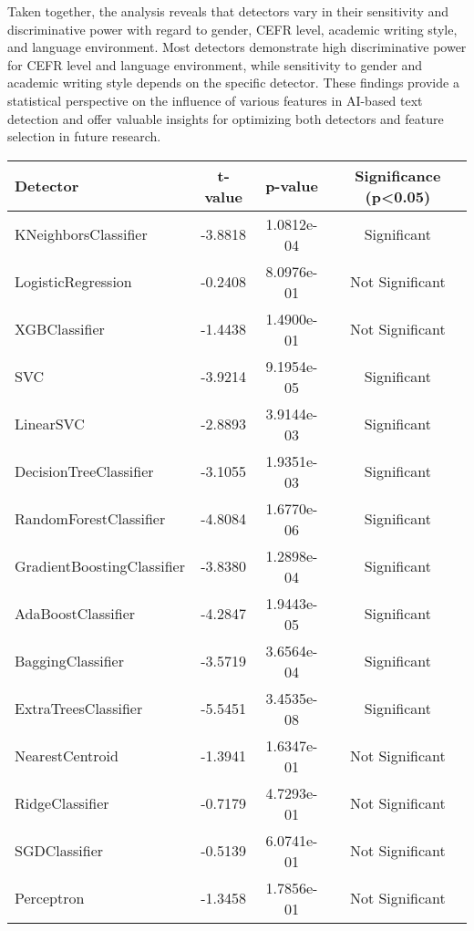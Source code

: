 Taken together, the analysis reveals that detectors vary in their sensitivity and discriminative power with regard to gender, CEFR level, academic writing style, and language environment. Most detectors demonstrate high discriminative power for CEFR level and language environment, while sensitivity to gender and academic writing style depends on the specific detector. These findings provide a statistical perspective on the influence of various features in AI-based text detection and offer valuable insights for optimizing both detectors and feature selection in future research.


\begin{table*}[htbp]
\centering
\small
\begin{tabular}{lccc}
\toprule
\textbf{Detector} & \textbf{t-value} & \textbf{p-value} & \textbf{Significance (p<0.05)} \\
\midrule
KNeighborsClassifier            & -3.8818 & 1.0812e-04 & Significant \\
LogisticRegression              & -0.2408 & 8.0976e-01 & Not Significant \\
XGBClassifier                   & -1.4438 & 1.4900e-01 & Not Significant \\
SVC                             & -3.9214 & 9.1954e-05 & Significant \\
LinearSVC                       & -2.8893 & 3.9144e-03 & Significant \\
DecisionTreeClassifier          & -3.1055 & 1.9351e-03 & Significant \\
RandomForestClassifier          & -4.8084 & 1.6770e-06 & Significant \\
GradientBoostingClassifier      & -3.8380 & 1.2898e-04 & Significant \\
AdaBoostClassifier              & -4.2847 & 1.9443e-05 & Significant \\
BaggingClassifier               & -3.5719 & 3.6564e-04 & Significant \\
ExtraTreesClassifier            & -5.5451 & 3.4535e-08 & Significant \\
NearestCentroid                 & -1.3941 & 1.6347e-01 & Not Significant \\
RidgeClassifier                 & -0.7179 & 4.7293e-01 & Not Significant \\
SGDClassifier                   & -0.5139 & 6.0741e-01 & Not Significant \\
Perceptron                      & -1.3458 & 1.7856e-01 & Not Significant \\

\end{tabular}
\end{table*}
